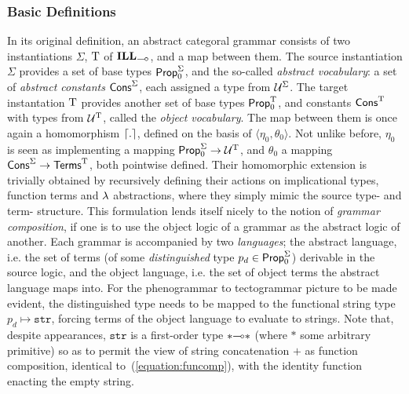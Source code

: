 \subsubsection{Basic Definitions}
In its original definition, an abstract categoral grammar consists of two instantiations $\Sigma$, $\mathrm{T}$ of $\ILL_{\li}$, and a map between them.
The source instantiation $\Sigma$ provides a set of base types $\mathsf{Prop}_0^{\Sigma}$, and the so-called \textit{abstract vocabulary}: a set of \textit{abstract constants} $\mathsf{Cons}^{\Sigma}$, each assigned a type from $\mathcal{U}^{\Sigma}$.
The target instantation $\mathrm{T}$ provides another set of base types $\mathsf{Prop}_0^{\mathrm{T}}$, and constants $\mathsf{Cons}^{\mathrm{T}}$ with types from $\mathcal{U}^{\mathrm{T}}$, called the \textit{object vocabulary}.
The map between them is once again a homomorphism $\lceil{.}\rceil$, defined on the basis of $\langle \eta_0, \theta_0\rangle$.
Not unlike before, $\eta_0$ is seen as implementing a mapping $\mathsf{Prop}_0^{\Sigma} \to \mathcal{U}^{\mathrm{T}}$, and $\theta_0$ a mapping $\mathsf{Cons}^{\Sigma}\to \mathsf{Terms}^{\mathrm{T}}$, both pointwise defined.
Their homomorphic extension is trivially obtained by recursively defining their actions on implicational types, function terms and $\mathnormal{\lambda}$ abstractions, where they simply mimic the source type- and term- structure.
This formulation lends itself nicely to the notion of \textit{grammar composition}, if one is to use the object logic of a grammar as the abstract logic of another.
Each grammar is accompanied by two \textit{languages}; the abstract language, i.e. the set of terms (of some \textit{distinguished} type $p_d\in \mathsf{Prop}_0^{\Sigma}$) derivable in the source logic, and the object language, i.e. the set of object terms the abstract language maps into.
For the phenogrammar to tectogrammar picture to be made evident, the distinguished type needs to be mapped to the functional string type $p_{d} \mapsto \mathtt{str}$, forcing terms of the object language to evaluate to strings.
Note that, despite appearances, $\mathtt{str}$ is a first-order type $*\li *$ (where $*$ some arbitrary primitive) so as to permit the view of string concatenation $+$ as function composition, identical to~(\ref{equation:funcomp}), with the identity function enacting the empty string.

